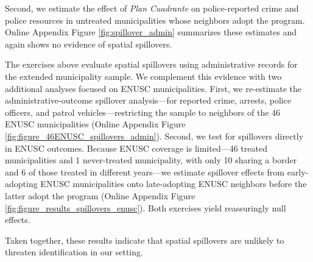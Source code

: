 Second, we estimate the effect of \emph{Plan Cuadrante} on police-reported crime and police resources in untreated municipalities whose neighbors adopt the program. Online Appendix Figure \ref{fig:spillover_admin} summarizes these estimates and again shows no evidence of spatial spillovers.

The exercises above evaluate spatial spillovers using administrative records for the extended municipality sample. We complement this evidence with two additional analyses focused on ENUSC municipalities. First, we re-estimate the administrative-outcome spillover analysis---for reported crime, arrests, police officers, and patrol vehicles---restricting the sample to neighbors of the 46 ENUSC municipalities (Online Appendix Figure \ref{fig:figure_46ENUSC_spillovers_admin}). Second, we test for spillovers directly in ENUSC outcomes. Because ENUSC coverage is limited---46 treated municipalities and 1 never-treated municipality, with only 10 sharing a border and 6 of those treated in different years---we estimate spillover effects from early-adopting ENUSC municipalities onto late-adopting ENUSC neighbors before the latter adopt the program (Online Appendix Figure \ref{fig:figure_results_spillovers_enusc}). Both exercises yield reassuringly null effects.

Taken together, these results indicate that spatial spillovers are unlikely to threaten identification in our setting.

\FloatBarrier